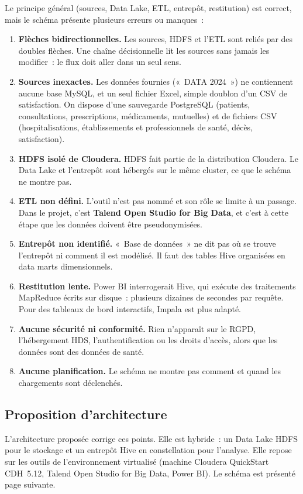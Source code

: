 \noindent Le principe général (sources, Data Lake, ETL, entrepôt, restitution) est correct, mais le schéma présente plusieurs erreurs ou manques~:
\begin{enumerate}
	\item \textbf{Flèches bidirectionnelles.} Les sources, HDFS et l'ETL sont reliés par des doubles flèches. Une chaîne décisionnelle lit les sources sans jamais les modifier~: le flux doit aller dans un seul sens.
	\item \textbf{Sources inexactes.} Les données fournies («~DATA 2024~») ne contiennent aucune base MySQL, et un seul fichier Excel, simple doublon d'un CSV de satisfaction. On dispose d'une sauvegarde PostgreSQL (patients, consultations, prescriptions, médicaments, mutuelles) et de fichiers CSV (hospitalisations, établissements et professionnels de santé, décès, satisfaction).
	\item \textbf{HDFS isolé de Cloudera.} HDFS fait partie de la distribution Cloudera. Le Data Lake et l'entrepôt sont hébergés sur le même cluster, ce que le schéma ne montre pas.
	\item \textbf{ETL non défini.} L'outil n'est pas nommé et son rôle se limite à un passage. Dans le projet, c'est \textbf{Talend Open Studio for Big Data}, et c'est à cette étape que les données doivent être pseudonymisées.
	\item \textbf{Entrepôt non identifié.} «~Base de données~» ne dit pas où se trouve l'entrepôt ni comment il est modélisé. Il faut des tables Hive organisées en data marts dimensionnels.
	\item \textbf{Restitution lente.} Power BI interrogerait Hive, qui exécute des traitements MapReduce écrits sur disque~: plusieurs dizaines de secondes par requête. Pour des tableaux de bord interactifs, Impala est plus adapté.
	\item \textbf{Aucune sécurité ni conformité.} Rien n'apparaît sur le RGPD, l'hébergement HDS, l'authentification ou les droits d'accès, alors que les données sont des données de santé.
	\item \textbf{Aucune planification.} Le schéma ne montre pas comment et quand les chargements sont déclenchés.
\end{enumerate}

\subsection{Proposition d'architecture}

\noindent L'architecture proposée corrige ces points. Elle est hybride~: un Data Lake HDFS pour le stockage et un entrepôt Hive en constellation pour l'analyse. Elle repose sur les outils de l'environnement virtualisé (machine Cloudera QuickStart CDH~5.12, Talend Open Studio for Big Data, Power BI). Le schéma est présenté page suivante.

